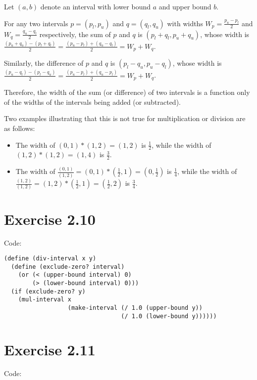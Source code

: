\documentclass[../main.tex]{subfiles}
\begin{document}
Let $(a, b)$ denote an interval with
 lower bound $a$ and upper bound $b$.

For any two intervals $p=(p_l, p_u)$
 and $q=(q_l, q_u)$ with widths $W_p = \frac{p_u - p_l}{2}$
 and $W_q = \frac{q_u - q_l}{2}$
 respectively, the sum of $p$ and $q$ is
 $(p_l + q_l, p_u + q_u)$, whose width is
 $\frac{(p_u + q_u) - (p_l + q_l)}{2} =
 \frac{(p_u - p_l) + (q_u - q_l)}{2} = W_p + W_q$.

Similarly, the difference of $p$ and $q$ is
 $(p_l - q_u, p_u - q_l)$, whose width is
 $\frac{(p_u - q_l) - (p_l - q_u)}{2} = 
 \frac{(p_u - p_l) + (q_u - p_l)}{2} = W_p + W_q$.

Therefore, the width of the sum (or difference) of two
 intervals is a function only of the widths of the intervals
 being added (or subtracted).

Two examples illustrating that this is not true for
 multiplication or division are as follows:

\begin{itemize}
\item The width of $(0, 1) * (1, 2) = (1, 2)$ is $\frac{1}{2}$,
 while the width of $(1, 2) * (1, 2) = (1, 4)$ is $\frac{3}{2}$.
\item The width of $\frac{(0, 1)}{(1, 2)} = (0, 1) *
 (\frac{1}{2}, 1) = (0, \frac{1}{2})$ is $\frac{1}{4}$,
 while the width of $\frac{(1, 2)}{(1, 2)} = (1, 2) *
 (\frac{1}{2}, 1) = (\frac{1}{2}, 2)$ is $\frac{3}{4}$.
\end{itemize}

\section{Exercise 2.10}

Code:

\begin{lstlisting}
(define (div-interval x y)
  (define (exclude-zero? interval)
    (or (< (upper-bound interval) 0)
        (> (lower-bound interval) 0)))
  (if (exclude-zero? y)
    (mul-interval x
                  (make-interval (/ 1.0 (upper-bound y))
                                 (/ 1.0 (lower-bound y))))))
\end{lstlisting}

\section{Exercise 2.11}

Code:
\end{document}
